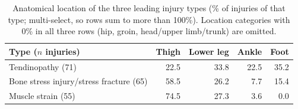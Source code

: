\begin{table}[htbp]
\centering
\footnotesize
\caption{Anatomical location of the three leading injury types (\% of injuries of that type; multi-select, so rows sum to more than 100\%). Location categories with 0\% in all three rows (hip, groin, head/upper limb/trunk) are omitted.}
\label{tab:injury-type-by-location}
\begin{tabular}{lrrrr}
\toprule
Type ($n$ injuries) & Thigh & Lower leg & Ankle & Foot \\
\midrule
Tendinopathy (71) & 22.5 & 33.8 & 22.5 & 35.2 \\
Bone stress injury/stress fracture (65) & 58.5 & 26.2 & 7.7 & 15.4 \\
Muscle strain (55) & 74.5 & 27.3 & 3.6 & 0.0 \\
\bottomrule
\end{tabular}
\end{table}

